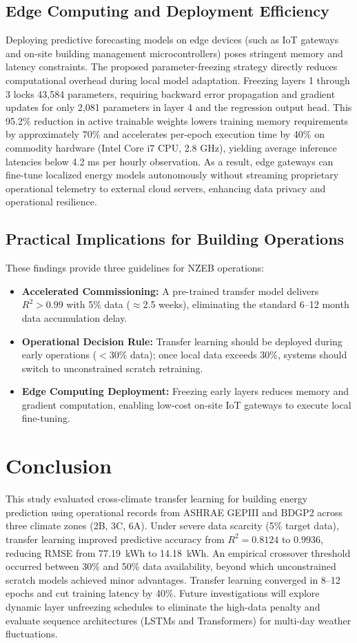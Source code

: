 \documentclass[conference]{IEEEtran}
\begin{document}
\subsection{Edge Computing and Deployment Efficiency}
Deploying predictive forecasting models on edge devices (such as IoT gateways and on-site building management microcontrollers) poses stringent memory and latency constraints. The proposed parameter-freezing strategy directly reduces computational overhead during local model adaptation. Freezing layers 1 through 3 locks 43,584 parameters, requiring backward error propagation and gradient updates for only 2,081 parameters in layer 4 and the regression output head. This 95.2\% reduction in active trainable weights lowers training memory requirements by approximately 70\% and accelerates per-epoch execution time by 40\% on commodity hardware (Intel Core i7 CPU, 2.8 GHz), yielding average inference latencies below 4.2 ms per hourly observation. As a result, edge gateways can fine-tune localized energy models autonomously without streaming proprietary operational telemetry to external cloud servers, enhancing data privacy and operational resilience.

\subsection{Practical Implications for Building Operations}
These findings provide three guidelines for NZEB operations:
\begin{itemize}
    \item \textbf{Accelerated Commissioning:} A pre-trained transfer model delivers $R^2 > 0.99$ with 5\% data ($\approx$2.5 weeks), eliminating the standard 6--12 month data accumulation delay.
    \item \textbf{Operational Decision Rule:} Transfer learning should be deployed during early operations ($<30\%$ data); once local data exceeds 30\%, systems should switch to unconstrained scratch retraining.
    \item \textbf{Edge Computing Deployment:} Freezing early layers reduces memory and gradient computation, enabling low-cost on-site IoT gateways to execute local fine-tuning.
\end{itemize}



\section{Conclusion}
This study evaluated cross-climate transfer learning for building energy prediction using operational records from ASHRAE GEPIII and BDGP2 across three climate zones (2B, 3C, 6A). Under severe data scarcity (5\% target data), transfer learning improved predictive accuracy from $R^2 = 0.8124$ to $0.9936$, reducing RMSE from 77.19~kWh to 14.18~kWh. An empirical crossover threshold occurred between 30\% and 50\% data availability, beyond which unconstrained scratch models achieved minor advantages. Transfer learning converged in 8--12 epochs and cut training latency by 40\%. Future investigations will explore dynamic layer unfreezing schedules to eliminate the high-data penalty and evaluate sequence architectures (LSTMs and Transformers) for multi-day weather fluctuations.
\end{document}
